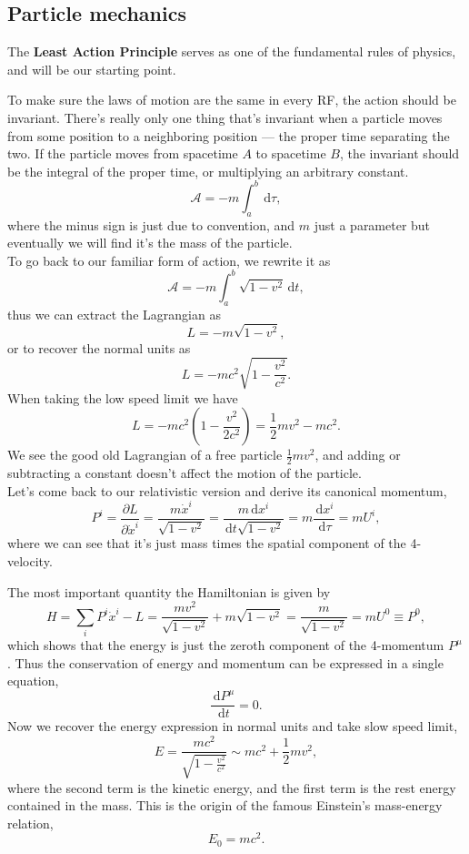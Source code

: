 \documentclass{article}
\newcommand{\be}{\begin{equation}}
\newcommand{\ee}{\end{equation}}
\newcommand{\dif}{\,\mathrm{d}}
\newcommand{\p}{\partial}
\newcommand{\1}{\left}
\newcommand{\2}{\right}
\newcommand{\ma}{\mathcal}
\newcommand{\m}{\mu}
\begin{document}
\subsection{Particle mechanics}

The \textbf{Least Action Principle} serves as one of the fundamental rules of physics, and will be our starting point.

To make sure the laws of motion are the same in every RF, the action should be invariant. There's really only one thing that's invariant when a particle moves from some position to a neighboring position --- the proper time separating the two. If the particle moves from spacetime $A$ to spacetime $B$, the invariant should be the integral of the proper time, or multiplying an arbitrary constant.
\be
\ma A=-m\int_a^b \dif \tau,
\ee
where the minus sign is just due to convention, and $m$ just a parameter but eventually we will find it's the mass of the particle.\\
To go back to our familiar form of action, we rewrite it as
\be
\ma A=-m\int_a^b \sqrt{1-v^2} \dif t,
\ee
thus we can extract the Lagrangian as
\be
L=-m \sqrt{1-v^2},
\ee
or to recover the normal units as
\be
L=-mc^2\sqrt{1-\frac{v^2}{c^2}}.
\ee
When taking the low speed limit we have
\be
L=-mc^2 \1(1-\frac{v^2}{2c^2}\2)=\frac1 2 mv^2-mc^2.
\ee
We see the good old Lagrangian of a free particle $\frac1 2mv^2$, and adding or subtracting a constant doesn't affect the motion of the particle.\\

Let's come back to our relativistic version and derive its canonical momentum,
\be
P^i=\frac{\p L}{\p \dot x^i} = \frac{m\dot x^i}{\sqrt{1-v^2}}=\frac{m\dif x^i}{\dif t\sqrt{1-v^2}}=m\frac{\dif x^i}{\dif\tau}=mU^i,
\ee
where we can see that it's just mass times the spatial component of the 4-velocity.

The most important quantity the Hamiltonian is given by
\be
H = \sum_i P^i \dot x^i -L= \frac{m v^2}{\sqrt{1-v^2}}+m \sqrt{1-v^2}=\frac{m}{\sqrt{1-v^2}}=mU^0\equiv P^0,
\ee
which shows that the energy is just the zeroth component of the 4-momentum $P^\m$. Thus the conservation of energy and momentum can be expressed in a single equation,
\be
\frac{\dif P^\m}{\dif t}=0.
\ee
Now we recover the energy expression in normal units and take slow speed limit,
\be
E=\frac{mc^2}{\sqrt{1-\frac{v^2}{c^2}}} \sim mc^2+\frac1 2 mv^2,
\ee
where the second term is the kinetic energy, and the first term is the rest energy contained in the mass.
This is the origin of the famous Einstein's mass-energy relation,
\be
E_0=mc^2.
\ee
\end{document}
